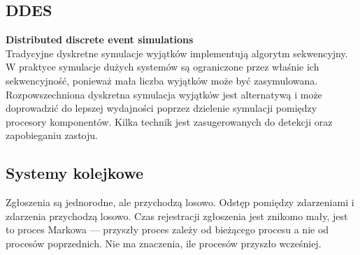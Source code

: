 \documentclass[10pt, a
4paper]{article}
\begin{document}
\subsection{DDES}
\noindent \textbf{Distributed discrete event simulations}\\
Tradycyjne dyskretne symulacje wyjątków implementują algorytm sekwencyjny. W praktyce symulacje dużych systemów są ograniczone przez właśnie ich sekwencyjność, ponieważ mała liczba wyjątków może być zasymulowana. Rozpowszechniona dyskretna symulacja wyjątków jest alternatywą i może doprowadzić do lepszej wydajności poprzez dzielenie symulacji pomiędzy procesory komponentów. Kilka technik jest zasugerowanych do detekcji oraz zapobieganiu zastoju.
\subsection{Systemy kolejkowe}
Zgłoszenia są jednorodne, ale przychodzą losowo. Odstęp pomiędzy zdarzeniami i zdarzenia przychodzą losowo. Czas rejestracji zgłoszenia jest znikomo mały, jest to proces Markowa --– przyszły proces zależy od bieżącego procesu a nie od procesów poprzednich. Nie ma znaczenia, ile procesów przyszło wcześniej.
\end{document}
